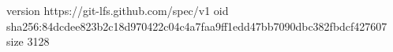 version https://git-lfs.github.com/spec/v1
oid sha256:84dcdee823b2c18d970422c04c4a7faa9ff1edd47bb7090dbc382fbdcf427607
size 3128
